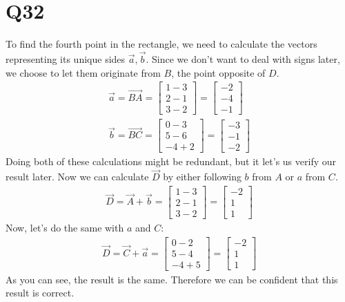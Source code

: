 \documentclass{article}
\begin{document}
\section*{Q32}
To find the fourth point in the rectangle, we need to calculate the vectors representing its unique sides $\vec a, \vec b$. Since we don't want to deal with signs later, we choose to let them originate from $B$, the point opposite of $D$.
\begin{align}
   \vec a = \vec{BA} = 
   \begin{bmatrix}
        1 - 3\\
        2 - 1\\
        3 - 2
   \end{bmatrix} =
   \begin{bmatrix}
       -2\\
       -4\\
       -1
   \end{bmatrix}\\
   \vec b = \vec{BC} =
   \begin{bmatrix}
        0 - 3\\
        5 - 6\\
        -4 + 2    
   \end{bmatrix} =
   \begin{bmatrix}
       -3\\
       -1\\
       -2
   \end{bmatrix}
\end{align}
Doing both of these calculations might be redundant, but it let's us verify our result later. Now we can calculate $\vec D$ by either following $b$ from $A$ or $a$ from $C$.
\begin{align}
    \vec D = \vec A + \vec b =
    \begin{bmatrix}
        1 - 3\\
        2 - 1\\
        3 - 2
    \end{bmatrix} =
    \begin{bmatrix}
        -2\\
        1\\
        1
    \end{bmatrix}
\end{align}
Now, let's do the same with $a$ and $C$:
\begin{align}
    \vec D = \vec C + \vec a =
    \begin{bmatrix}
        0 - 2\\
        5 - 4\\
        -4 + 5
    \end{bmatrix} =
    \begin{bmatrix}
        -2\\
        1\\
        1
    \end{bmatrix}
\end{align}
As you can see, the result is the same. Therefore we can be confident that this result is correct.
\end{document}
